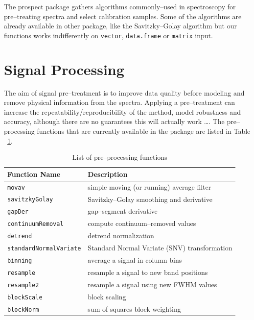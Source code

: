 \documentclass[12pt]{article}\usepackage{graphicx, color}
\newcommand{\Rfunction}[1]{{\texttt{#1}}}
\newcommand{\Robject}[1]{{\texttt{#1}}}
\begin{document}
The prospect package gathers algorithms commonly--used in spectroscopy for pre--treating spectra and select calibration samples. Some of the algorithms are already available in other package, like the Savitzky--Golay algorithm \cite{savitzky1964} but our functions works indifferently on \Robject{vector}, \Robject{data.frame} or \Robject{matrix} input. 

\section{Signal Processing}

The aim of signal pre--treatment is to improve data quality before modeling and remove physical information from the spectra. Applying a pre--treatment can increase the repeatability/reproducibility of the method, model robustness and accuracy, although there are no guarantees this will actually work \dots. The pre--processing functions that are currently available in the package are listed in Table ~\ref{tab:fun}.

\begin{table}[h]
\caption{List of pre--processing functions}
\centering
\begin{tabular}{l|l}
\hline
Function Name & Description  \\
\hline  \Rfunction{movav} & simple moving (or running) average filter   \\  
\Rfunction{savitzkyGolay} & Savitzky--Golay smoothing and derivative  \\      
\Rfunction{gapDer} & gap--segment derivative  \\                       
\Rfunction{continuumRemoval} & compute continuum--removed values \\                               
\Rfunction{detrend} & detrend normalization \\
\Rfunction{standardNormalVariate} & Standard Normal Variate (SNV) transformation \\
\Rfunction{binning} & average a signal in column bins \\
\Rfunction{resample} & resample a signal to new band positions \\
\Rfunction{resample2} & resample a signal using new FWHM values \\
\Rfunction{blockScale} & block scaling \\
\Rfunction{blockNorm}& sum of squares block weighting \\
\hline
\end{tabular}
\label{tab:fun}
\end{table}
\end{document}
